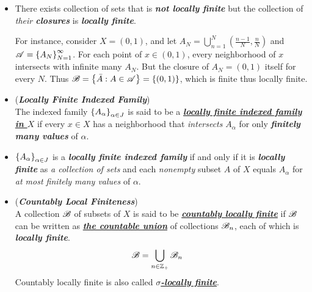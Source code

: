 \documentclass[11pt]{article}
\begin{document}
\begin{itemize}
\item \begin{remark}
There exists collection of sets that is \emph{\textbf{not locally finite}} but the collection of \emph{their \textbf{closures}} is \emph{\textbf{locally finite}}.

For instance, consider $X = (0, 1)$, and let $A_{N} = \bigcup_{n=1}^{N}(\frac{n-1}{N}, \frac{n}{N})$ and ${\mathscr A} = \left\{A_N\right\}_{N=1}^{\infty}$. For each point of $x \in (0,1)$, every neighborhood of $x$ intersects with infinite many $A_N$. But the closure of $A_N = (0,1)$ itself for every $N$. Thus ${\mathscr B} = \left\{\bar{A}: A \in {\mathscr A}\right\} = \left\{(0,1)\right\}$, which is finite thus locally finite.
\end{remark}

\item \begin{definition} (\emph{\textbf{Locally Finite Indexed Family}})\\
The indexed family $\left\{A_{\alpha}\right\}_{\alpha \in J}$ is said to be a \underline{\emph{\textbf{locally finite indexed family in $X$}}} if every $x \in X$ has a neighborhood that \emph{intersects} $A_{\alpha}$ for only \emph{\textbf{finitely many values}} of $\alpha$.
\end{definition}

\item \begin{remark}
$\left\{A_{\alpha}\right\}_{\alpha \in J}$ is a \emph{\textbf{locally finite indexed family}} if and only if it is \emph{\textbf{locally finite}} as \emph{a collection of sets} and each \emph{nonempty} subset $A$ of $X$ equals $A_{\alpha}$ for \emph{at most finitely many values} of $\alpha$.
\end{remark}

\item \begin{definition}  (\emph{\textbf{Countably Local Finiteness}})\\
A collection ${\mathscr B}$ of subsets of $X$ is said to be \underline{\emph{\textbf{countably locally finite}}} if ${\mathscr B}$ can be written as \underline{\emph{\textbf{the countable union}}} of collections ${\mathscr B}_n$, each of which is \emph{\textbf{locally finite}}. 
\begin{align*}
{\mathscr B} &= \bigcup_{n\in {\mathbb Z}_{+}}{\mathscr B}_{n}
\end{align*} Countably locally finite is also called \underline{\emph{\textbf{$\sigma$-locally finite}}}.
\end{definition}


\end{itemize}
\end{document}

